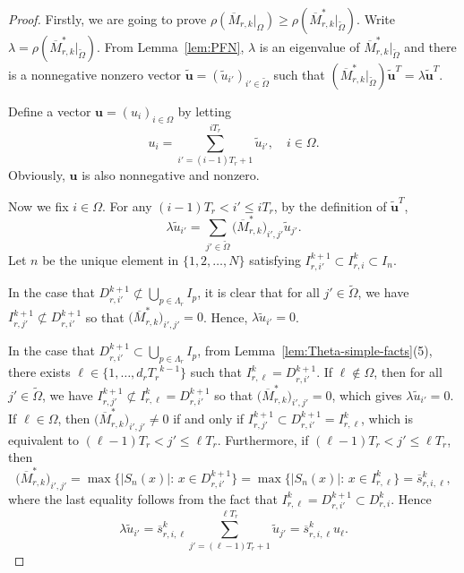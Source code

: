 \documentclass[10pt,a4paper]{amsart}
\def\wdt{\widetilde}
\newcommand{\bfu}{{\mathbf u}}
\newcommand{\upM}{{\overline{M}}}
\newcommand{\ups}{{\overline{s} }}
\begin{document}
\begin{proof}

Firstly, we are going to prove $\rho(\upM_{r,k} |_\Omega)\geq \rho(\upM_{r,k}^* |_{\wdt{\Omega}})$.
Write $\lambda=\rho(\upM_{r,k}^*|_{\wdt{\Omega}} )$.
From Lemma~\ref{lem:PFN}, 
$\lambda$ is an eigenvalue of $\upM_{r,k}^* |_{\wdt{\Omega}}$ and there is a nonnegative nonzero vector 
$ \wdt\bfu=(\wdt{u}_{i'})_{i'\in \wdt{\Omega}}$ such that $(\upM_{r,k}^* |_{\wdt{\Omega}}) \wdt\bfu^T =\lambda \wdt\bfu^T$.

Define a vector $\bfu=(u_i)_{i\in\Omega}$ by letting
\[
{u}_i=\sum_{i'=(i-1)T_r+1}^{iT_r} \wdt{u}_{i'}, \quad i\in\Omega.
\]
Obviously, $\bfu$ is also nonnegative and nonzero. 


Now we fix $i\in \Omega$. For any $(i-1)T_r<i'\leq iT_r$, by the definition of $\wdt\bfu^T$,
\[
  \lambda \wdt{u}_{i'} =\sum_{j'\in \wdt{\Omega}} \big(\upM_{r,k}^*\big)_{i',j'}  \wdt{u}_{j'}.
\]
Let $n$ be the unique element in $\{1,2,\ldots,N\}$ satisfying $I_{r,i'}^{k+1}\subset I_{r,i}^k\subset I_n$.

In the case that $D_{r,i'}^{k+1}\not\subset \bigcup_{p\in \Lambda_r} I_p$, it is clear that for all $j'\in\wdt{\Omega}$, we have $I^{k+1}_{r,j'}\not\subset D_{r,i'}^{k+1}$ so that $\big(\upM_{r,k}^*\big)_{i',j'}=0$. Hence, $\lambda \wdt{u}_{i'}=0$.  

In the case that $D_{r,i'}^{k+1}\subset \bigcup_{p\in \Lambda_r} I_p$, from Lemma~\ref{lem:Theta-simple-facts}(5), there exists $\ell\in\{1,\ldots,d_r{T_r}^{k-1}\}$ such that $I_{r,\ell}^k=D_{r,i'}^{k+1}$. If $\ell\not\in\Omega$, then for all $j'\in\wdt{\Omega}$, we have $I^{k+1}_{r,j'}\not\subset I_{r,\ell}^k= D_{r,i'}^{k+1}$ so that $\big(\upM_{r,k}^*\big)_{i',j'}=0$, which gives $\lambda \wdt{u}_{i'}=0$. If $\ell\in\Omega$, then 
$\big(\upM_{r,k}^*\big)_{i',j'}\not=0$ if and only if $I^{k+1}_{r,j'}\subset D_{r,i'}^{k+1}=I^k_{r,\ell}$, which is equivalent to $(\ell-1)T_r<j'\leq \ell T_r$. Furthermore, if $(\ell-1)T_r<j'\leq \ell T_r$, then
\[
\big(\upM_{r,k}^*\big)_{i',j'}=\max \big\{|S_n(x)|:\, x\in D^{k+1}_{r,i'} \big\}
=\max\big\{|S_n(x)|:\, x\in I^k_{r,\ell}\big\}=\ups_{r,i,\ell}^k,
\]
where the last equality follows from the fact that $I_{r,\ell}^k=D_{r,i'}^{k+1}\subset D_{r,i}^k$. Hence
\[
\lambda \wdt{u}_{i'} = \ups_{r,i,\ell}^k \sum_{j'=(\ell-1)T_r+1}^{ \ell T_r } \wdt{u}_{j'}
=\ups_{r,i,\ell}^k  {u}_{\ell}.
\]


\end{proof}
\end{document}
